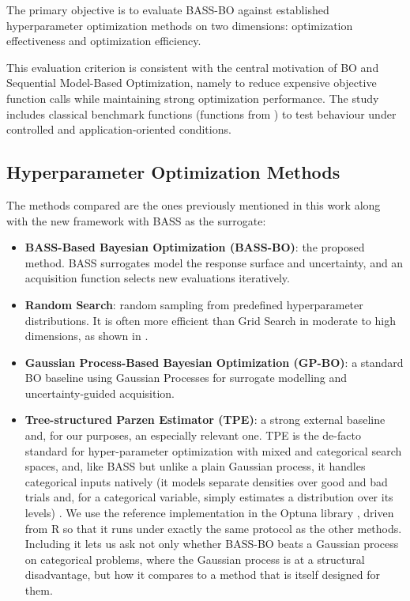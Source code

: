 The primary objective is to evaluate BASS-BO against established hyperparameter optimization methods on two dimensions: optimization effectiveness and optimization efficiency. 

This evaluation criterion is consistent with the central motivation of BO and Sequential Model-Based Optimization, namely to reduce expensive objective function calls while maintaining strong optimization performance. The study includes classical benchmark functions (functions from \cite{simulationlib}) to test behaviour under controlled and application-oriented conditions.

\subsection{Hyperparameter Optimization Methods}

The methods compared are the ones previously mentioned in this work along with the new framework with BASS as the surrogate:

\begin{itemize}
	\item \textbf{BASS-Based Bayesian Optimization (BASS-BO)}: the proposed method. BASS surrogates model the response surface and uncertainty, and an acquisition function selects new evaluations iteratively.
	
	\item \textbf{Random Search}: random sampling from predefined hyperparameter distributions. It is often more efficient than Grid Search in moderate to high dimensions, as shown in \cite{bergstra2012random}.
	
	\item \textbf{Gaussian Process-Based Bayesian Optimization (GP-BO)}: a standard BO baseline using Gaussian Processes for surrogate modelling and uncertainty-guided acquisition.

	\item \textbf{Tree-structured Parzen Estimator (TPE)}: a strong external baseline and, for our purposes, an especially relevant one. TPE is the de-facto standard for hyper-parameter optimization with mixed and categorical search spaces, and, like BASS but unlike a plain Gaussian process, it handles categorical inputs natively (it models separate densities over good and bad trials and, for a categorical variable, simply estimates a distribution over its levels) \cite{bergstra2011algorithms, watanabe2023tree}. We use the reference implementation in the Optuna library \cite{akiba2019optuna}, driven from R so that it runs under exactly the same protocol as the other methods. Including it lets us ask not only whether BASS-BO beats a Gaussian process on categorical problems, where the Gaussian process is at a structural disadvantage, but how it compares to a method that is itself designed for them.
\end{itemize}

